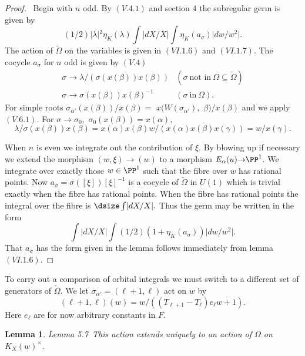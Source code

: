 \documentclass{memo-l}
\newtheorem{lemma}[theorem]{Lemma}
\theoremstyle{definition}
\theoremstyle{remark}
\numberwithin{section}{chapter}
\numberwithin{equation}{chapter}
\begin{document}
\begin{proof} \ Begin with $n$ odd.  By $(V.4.1)$ and section $4$ the
subregular germ is given by
$$
(1/2)\vert {\lambda}\vert {}^{2}{\eta}_{K}({\lambda}) \int\vert dX/X\vert
\int{\eta}_{K}(a_{{\sigma}})\vert dw/w^{2}\vert .
$$
The action of $\tilde{\Omega} $ on the variables is given in $(VI.1.6)$ and
$(VI.1.7)$.  The cocycle ${a}_{{\sigma}}$ for $n$ odd is given by
$(V.4)$
$$
\begin{matrix}
{\sigma} {\to} {\lambda}/({\sigma}(x({\beta}))x({\beta})) &
({\sigma}\ {\text{not\ in}}\ {\Omega} {\subseteq} \tilde{\Omega})\\
{\sigma} {\to} {\sigma}(x({\beta}))x({\beta})^{-1} & ({\sigma}\ {\text{in}}\
{\Omega}).
\end{matrix}
$$
For simple roots ${\sigma}_{{\alpha}'}(x({\beta}))/x({\beta})  =$
$x(W({\sigma}_{{\alpha}'}),$  ${\beta})/x({\beta})$ and we apply $(V.6.1)$.  For
${\sigma} {\to} {\sigma}_{0},$ ${\sigma}_{0}(x({\beta}))  =  x({\alpha}),$
$${\lambda}/{\sigma}(x({\beta}))x({\beta})  =
x({\alpha})x({\beta})w/(x({\alpha})x({\beta})x({\gamma}))  =
w/x({\gamma}).$$


   When $n$ is even we integrate out the contribution of ${\xi}$.  By
blowing up if necessary we extend the morphism $(w,{\xi}) {\to} (w)$ to a
morphism $E_{{\alpha}}(u) {\to} {\PP}^{1}$.  We integrate over exactly
those $w  \in  {\PP}^{1}$ such that the fibre over $w$ has rational
points.  Now $a_{{\sigma}}  =  {\sigma}([{\xi}])[{\xi}]^{-1}$ is a cocycle of
$\tilde {\Omega } $ in $U(1)$ which is trivial exactly when the fibre has
rational points.  When the fibre has rational points the integral over the
fibre is ${\dsize\int}\vert dX/X\vert .$ Thus the germ may be written in the form
$$
\int\vert dX/X\vert \int (1/2)(1+{\eta}_{K}(a_{{\sigma}}))\vert
dw/w^{2}\vert.
$$
That $a_{{\sigma}}$ has the form given in the lemma follows immediately
from lemma $(VI.1.6)$.
\end{proof}

{\medskip}

   To carry out a comparison of orbital integrals we must switch to a
different set of generators of $\tilde {\Omega } .$ We let
${\sigma}_{{\alpha}'} = ({\ell}+1,{\ell})$ act on $w$ by
$$
({\ell}+1,{\ell})(w)  =  w/((T_{{\ell}+1}-T_{{\ell}})e_{{\ell}}w + 1).
$$
Here $e_\ell$ are for now arbitrary constants in $F$.

\medpagebreak

\begin{lemma}{Lemma 5.7}\ This action extends uniquely to an action of
${\Omega}$ on $K_X(w)^{\times}$.
\end{lemma}
\end{document}
